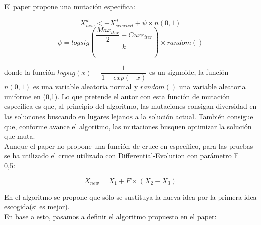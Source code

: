 El paper propone una mutación específica:

\[X^d_{new} <-X^d_{selected} + \psi \times n(0,1) \]
\[\psi = logsig\left(\dfrac{\dfrac{Max_{iter}}{2}-Curr_{iter}}{k}\right)\times random()\]

donde la función $logsig(x)=\dfrac{1}{1+exp(-x)}$ es un sigmoide, la función $n(0,1)$ es una variable aleatoria normal y $random()$ una variable aleatoria uniforme en (0,1). Lo que pretende el autor con esta función de mutación específica es que, al principio del algoritmo, las mutaciones consigan diversidad en las soluciones buscando en lugares lejanos a la solución actual. También consigue que, conforme avance el algoritmo, las mutaciones busquen optimizar la solución que muta.\\

Aunque el paper no propone una función de cruce en específico, para las pruebas se ha utilizado el cruce utilizado con Differential-Evolution con parámetro F = 0,5:

\[X_{new} = X_1 + F\times(X_2-X_3)\]

En el algoritmo se propone que sólo se sustituya la nueva idea por la primera idea escogida(si es mejor).\\

En base a esto, pasamos a definir el algoritmo propuesto en el paper:\\

